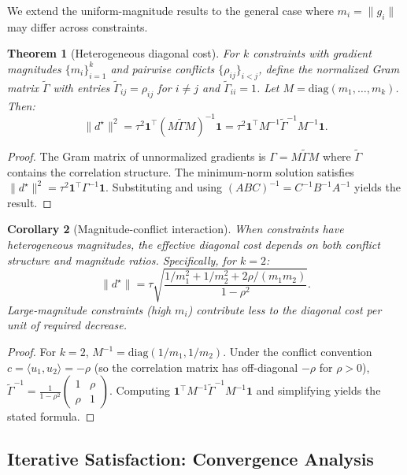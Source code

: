 \documentclass{article}
\theoremstyle{plain}
\newtheorem{theorem}{Theorem}[section]
\newtheorem{corollary}[theorem]{Corollary}
\theoremstyle{definition}
\theoremstyle{remark}
\begin{document}
We extend the uniform-magnitude results to the general case where $m_i = \|g_i\|$ may differ across constraints.

\begin{theorem}[Heterogeneous diagonal cost]
For $k$ constraints with gradient magnitudes $\{m_i\}_{i=1}^k$ and pairwise conflicts $\{\rho_{ij}\}_{i<j}$, define the normalized Gram matrix $\tilde{\Gamma}$ with entries $\tilde{\Gamma}_{ij} = \rho_{ij}$ for $i \neq j$ and $\tilde{\Gamma}_{ii} = 1$. Let $M = \mathrm{diag}(m_1, \ldots, m_k)$. Then:
\[
\|d^\star\|^2 = \tau^2 \mathbf{1}^\top (M \tilde{\Gamma} M)^{-1} \mathbf{1} = \tau^2 \mathbf{1}^\top M^{-1} \tilde{\Gamma}^{-1} M^{-1} \mathbf{1}.
\]
\end{theorem}

\begin{proof}
The Gram matrix of unnormalized gradients is $\Gamma = M \tilde{\Gamma} M$ where $\tilde{\Gamma}$ contains the correlation structure. The minimum-norm solution satisfies $\|d^\star\|^2 = \tau^2 \mathbf{1}^\top \Gamma^{-1} \mathbf{1}$. Substituting and using $(ABC)^{-1} = C^{-1}B^{-1}A^{-1}$ yields the result.
\end{proof}

\begin{corollary}[Magnitude-conflict interaction]
When constraints have heterogeneous magnitudes, the effective diagonal cost depends on both conflict structure and magnitude ratios. Specifically, for $k=2$:
\[
\|d^\star\| = \tau \sqrt{\frac{1/m_1^2 + 1/m_2^2 + 2\rho/(m_1 m_2)}{1-\rho^2}}.
\]
Large-magnitude constraints (high $m_i$) contribute less to the diagonal cost per unit of required decrease.
\end{corollary}

\begin{proof}
For $k=2$, $M^{-1} = \mathrm{diag}(1/m_1, 1/m_2)$. Under the conflict convention $c = \langle u_1, u_2 \rangle = -\rho$ (so the correlation matrix has off-diagonal $-\rho$ for $\rho>0$), $\tilde{\Gamma}^{-1} = \frac{1}{1-\rho^2}\begin{pmatrix} 1 & \rho \\ \rho & 1 \end{pmatrix}$. Computing $\mathbf{1}^\top M^{-1} \tilde{\Gamma}^{-1} M^{-1} \mathbf{1}$ and simplifying yields the stated formula.
\end{proof}

\subsection{Iterative Satisfaction: Convergence Analysis}\label{app:convergence}
\end{document}
